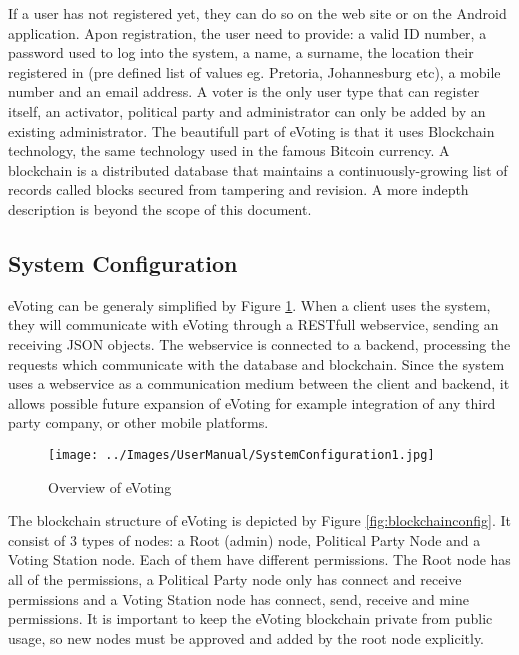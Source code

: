 \documentclass[11pt]{article}
\begin{document}
	If a user has not registered yet, they can do so on the web site or on the Android application. Apon registration, the user need to provide: a valid ID number, a password used to log into the system, a name, a surname, the location their registered in (pre defined list of values eg. Pretoria, Johannesburg etc), a mobile number and an email address. A voter is the only user type that can register itself, an activator, political party and administrator can only be added by an existing administrator.\newline\newline
	The beautifull part of eVoting is that it uses Blockchain technology, the same technology used in the famous Bitcoin currency. A blockchain is a distributed database that maintains a continuously-growing list of records called blocks secured from tampering and revision. A more indepth description is beyond the scope of this document.
	
	\subsection{System Configuration}
	eVoting can be generaly simplified by Figure \ref{fig:overview}. When a client uses the system, they will communicate with eVoting through a RESTfull webservice, sending an receiving JSON objects. The webservice is connected to a backend, processing the requests which communicate with the database and blockchain. Since the system uses a webservice as a communication medium between the client and backend, it allows possible future expansion of eVoting for example integration of any third party company, or other mobile platforms.
					\begin{figure}[H]
						\centering
						\texttt{[image: ../Images/UserManual/SystemConfiguration1.jpg]}
						\caption{Overview of eVoting}
						\label{fig:overview}
					\end{figure}
					
	The blockchain structure of eVoting is depicted by Figure \ref{fig:blockchainconfig}. It consist of 3 types of nodes: a Root (admin) node, Political Party Node and a Voting Station node. Each of them have different permissions. The Root node has all of the permissions, a Political Party node only has connect and receive permissions and a Voting Station node has connect, send, receive and mine permissions. It is important to keep the eVoting blockchain private from public usage, so new nodes must be approved and added by the root node explicitly.
	\newline
	
\end{document}
